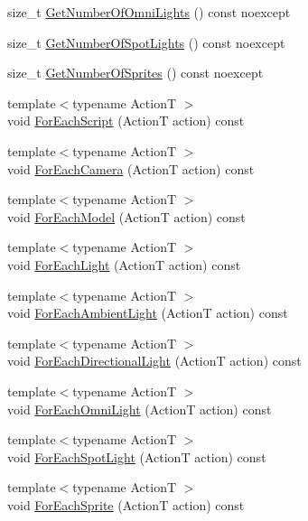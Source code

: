 \begin{DoxyCompactItemize}
\item 
size\+\_\+t \hyperlink{classmage_1_1_scene_ac043f20c6cf845244a3258593b3c2814}{Get\+Number\+Of\+Omni\+Lights} () const noexcept
\item 
size\+\_\+t \hyperlink{classmage_1_1_scene_af7bdbd447a50beb83ae5573f7e5505db}{Get\+Number\+Of\+Spot\+Lights} () const noexcept
\item 
size\+\_\+t \hyperlink{classmage_1_1_scene_a124042421abfee563342e50032d4051f}{Get\+Number\+Of\+Sprites} () const noexcept
\item 
{\footnotesize template$<$typename ActionT $>$ }\\void \hyperlink{classmage_1_1_scene_a4d16d973adce12868b9a0df9d92ef6d6}{For\+Each\+Script} (ActionT action) const
\item 
{\footnotesize template$<$typename ActionT $>$ }\\void \hyperlink{classmage_1_1_scene_ad8bf21d83004da3d0fa3ecee120be13b}{For\+Each\+Camera} (ActionT action) const
\item 
{\footnotesize template$<$typename ActionT $>$ }\\void \hyperlink{classmage_1_1_scene_a6327548021f874f22a1adc81cfc8a1ea}{For\+Each\+Model} (ActionT action) const
\item 
{\footnotesize template$<$typename ActionT $>$ }\\void \hyperlink{classmage_1_1_scene_a131c27235c6f172a316c56fea7f2e80c}{For\+Each\+Light} (ActionT action) const
\item 
{\footnotesize template$<$typename ActionT $>$ }\\void \hyperlink{classmage_1_1_scene_acf4c97b1de3c66afa22236e5da8b221a}{For\+Each\+Ambient\+Light} (ActionT action) const
\item 
{\footnotesize template$<$typename ActionT $>$ }\\void \hyperlink{classmage_1_1_scene_ad9e888d8851594b9565300e09de3ed7a}{For\+Each\+Directional\+Light} (ActionT action) const
\item 
{\footnotesize template$<$typename ActionT $>$ }\\void \hyperlink{classmage_1_1_scene_acd71cef84ec39e63852d5918c7b17863}{For\+Each\+Omni\+Light} (ActionT action) const
\item 
{\footnotesize template$<$typename ActionT $>$ }\\void \hyperlink{classmage_1_1_scene_a51bb697a9d96891bb7502317efff7ec1}{For\+Each\+Spot\+Light} (ActionT action) const
\item 
{\footnotesize template$<$typename ActionT $>$ }\\void \hyperlink{classmage_1_1_scene_ae181b160f9a75593db9f551c9c233329}{For\+Each\+Sprite} (ActionT action) const
\end{DoxyCompactItemize}
